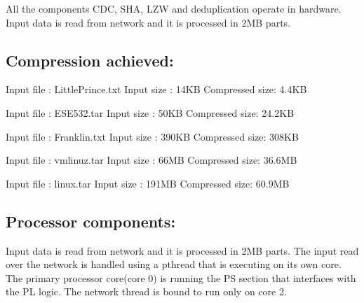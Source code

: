\documentclass{article}
\begin{document}
All the components CDC, SHA, LZW and deduplication operate in hardware. 
Input data is read from network and it is processed in 2MB parts. 


\subsection{Compression achieved:}

    Input file : LittlePrince.txt       
    \newline
    Input size : 14KB
    \newline
    Compressed size: 4.4KB
    \newline\newline
    
    Input file : ESE532.tar       
    \newline
    Input size : 50KB
    \newline
    Compressed size: 24.2KB
    \newline\newline

    Input file : Franklin.txt       
    \newline
    Input size : 390KB
    \newline
    Compressed size: 308KB
    \newline\newline

    Input file : vmlinuz.tar       
    \newline
    Input size : 66MB
    \newline
    Compressed size: 36.6MB
    \newline\newline

    Input file : linux.tar       
    \newline
    Input size : 191MB
    \newline
    Compressed size: 60.9MB
    \newline\newline


\subsection{Processor components:}

Input data is read from network and it is processed in 2MB parts. 
\newline
The input read over the network is handled using a pthread that is executing on its own core. 
\newline
The primary processor core(core 0) is running the PS section that interfaces with the PL logic. 
\newline
The network thread is bound to run only on core 2. 
\newline
\end{document}
